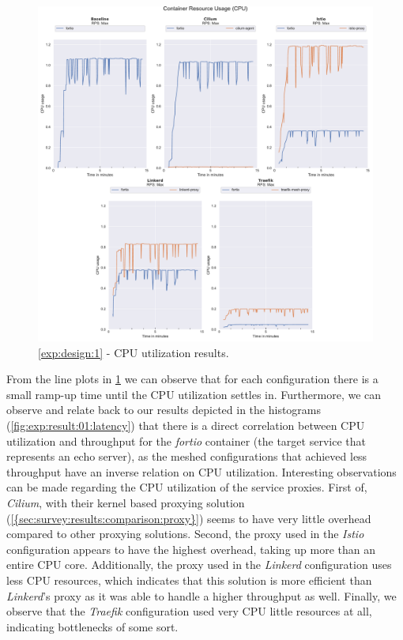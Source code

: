 \begin{figure}[!t]
    \centering
    
    \includegraphics[width=\linewidth]{5_experimental_evaluation/figures/exp_01-cpu-results.pdf}

    \caption{\ref{exp:design:1} - CPU utilization results.}
    
    \label{fig:exp:result:01:cpu}
\end{figure}


From the line plots in \cref{fig:exp:result:01:cpu} we can observe that for each configuration there is a small ramp-up time until the CPU utilization settles in. Furthermore, we can observe and relate back to our results depicted in the histograms (\cref{fig:exp:result:01:latency}) that there is a direct correlation between CPU utilization and throughput for the \textit{fortio} container (the target service that represents an echo server), as the meshed configurations that achieved less throughput have an inverse relation on CPU utilization. Interesting observations can be made regarding the CPU utilization of the service proxies. First of, \textit{Cilium}, with their kernel based proxying solution (\cref{{sec:survey:results:comparison:proxy}}) seems to have very little overhead compared to other proxying solutions. Second, the proxy used in the \textit{Istio} configuration appears to have the highest overhead, taking up more than an entire CPU core. Additionally, the proxy used in the \textit{Linkerd} configuration uses less CPU resources, which indicates that this solution is more efficient than \textit{Linkerd}'s proxy as it was able to handle a higher throughput as well. Finally, we observe that the \textit{Traefik} configuration used very CPU little resources at all, indicating bottlenecks of some sort.

